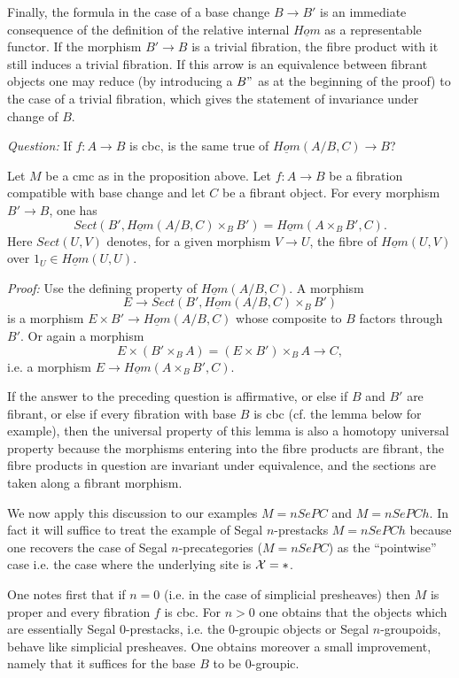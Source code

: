 Finally, the formula in the case of a base change $B\rightarrow B'$
is an immediate consequence of the definition of the relative internal
$\underline{Hom}$
as a representable functor. If the morphism $B'\rightarrow B$
is a trivial fibration,
the fibre product with it still induces a
trivial fibration. If this arrow is an equivalence between fibrant objects
one may reduce (by introducing a $B"$ as at the beginning of the
proof) to the case of a trivial fibration, which gives the statement
of invariance under change of $B$.
\eop

{\em Question:} If $f:A\rightarrow B$ is cbc, is the same true of
$\underline{Hom}(A/B,C)\rightarrow B$?

\begin{lemma}
\label{propunivHominterne}
Let $M$ be a cmc as in the proposition above. Let $f:A\rightarrow B$
be a fibration compatible with base change and let $C$ be a fibrant object.
For every morphism $B'\rightarrow B$, one has
$$
Sect (B', \underline{Hom}(A/B, C)\times _BB') =
\underline{Hom}(A\times _BB',C).
$$
Here $Sect(U,V)$ denotes,
for a given
morphism $V\rightarrow U$,
the fibre of
$\underline{Hom}(U,V)$ over $1_U\in \underline{Hom}(U,U)$.
\end{lemma}
{\em Proof:}
Use the defining property of $\underline{Hom}(A/B, C)$.
A morphism
$$
E\rightarrow Sect (B', \underline{Hom}(A/B, C)\times _BB')
$$
is a morphism $E\times B'\rightarrow \underline{Hom}(A/B, C)$
whose composite to $B$ factors through $B'$. Or again a
morphism
$$
E\times (B'\times _BA)= (E\times B')\times _B A\rightarrow C,
$$
i.e. a morphism $E\rightarrow \underline{Hom}(A\times _BB',C)$.
\eop


If the answer to the preceding question is affirmative,
or else if $B$
and $B'$ are fibrant, or else if every fibration with base $B$
is cbc (cf. the lemma below for example), then the universal
property
of this lemma is also a homotopy universal property because
the morphisms entering into the fibre
products are fibrant,
the fibre products in question are invariant under equivalence,
and the sections are taken along a fibrant morphism.

We now apply this discussion to our examples $M=nSePC$ and
$M=nSePCh$. In fact it will suffice to treat the example of Segal
$n$-prestacks $M=nSePCh$ because one recovers the case of Segal
$n$-precategories ($M=nSePC$)
as the ``pointwise'' case i.e. the case where the underlying site is
${\cal X} =\ast$.

One notes first that if $n=0$ (i.e. in the case of simplicial presheaves)
then $M$ is proper and every fibration $f$ is cbc. For $n>0$ one
obtains that
the objects which are essentially Segal $0$-prestacks, i.e. the
$0$-groupic objects or Segal $n$-groupoids, behave
like
simplicial presheaves. One obtains moreover a small improvement,
namely that it
suffices for the base $B$ to be $0$-groupic.

